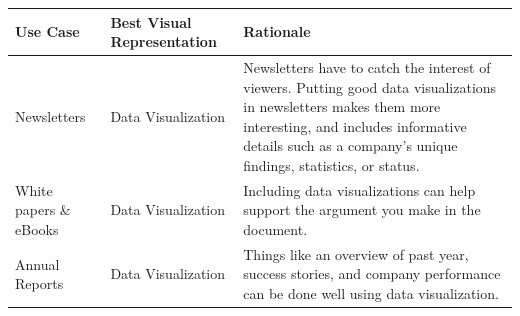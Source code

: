 \documentclass[]{book}
\begin{document}
\begin{longtable}[]{@{}lll@{}}
\toprule
\begin{minipage}[b]{0.11\columnwidth}\raggedright\strut
Use Case\strut
\end{minipage} & \begin{minipage}[b]{0.15\columnwidth}\raggedright\strut
Best Visual Representation\strut
\end{minipage} & \begin{minipage}[b]{0.47\columnwidth}\raggedright\strut
Rationale\strut
\end{minipage}\tabularnewline
\midrule
\endhead
\begin{minipage}[t]{0.11\columnwidth}\raggedright\strut
Newsletters\strut
\end{minipage} & \begin{minipage}[t]{0.15\columnwidth}\raggedright\strut
Data Visualization\strut
\end{minipage} & \begin{minipage}[t]{0.47\columnwidth}\raggedright\strut
Newsletters have to catch the interest of viewers. Putting good data
visualizations in newsletters makes them more interesting, and includes
informative details such as a company's unique findings, statistics, or
status.\strut
\end{minipage}\tabularnewline
\begin{minipage}[t]{0.11\columnwidth}\raggedright\strut
White papers \& eBooks\strut
\end{minipage} & \begin{minipage}[t]{0.15\columnwidth}\raggedright\strut
Data Visualization\strut
\end{minipage} & \begin{minipage}[t]{0.47\columnwidth}\raggedright\strut
Including data visualizations can help support the argument you make in
the document.\strut
\end{minipage}\tabularnewline
\begin{minipage}[t]{0.11\columnwidth}\raggedright\strut
Annual Reports\strut
\end{minipage} & \begin{minipage}[t]{0.15\columnwidth}\raggedright\strut
Data Visualization\strut
\end{minipage} & \begin{minipage}[t]{0.47\columnwidth}\raggedright\strut
Things like an overview of past year, success stories, and company
performance can be done well using data visualization.\strut
\end{minipage}\tabularnewline

\end{longtable}
\end{document}
